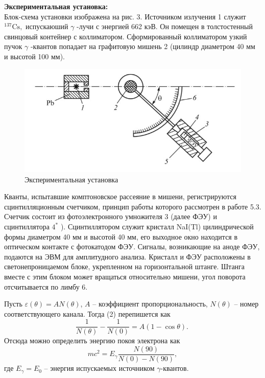 \documentclass[a4paper, 12pt]{article}%
\begin{document}
	
	\textbf{Экспериментальная установка: }\\
	Блок-схема установки изображена на рис. $3 .$ Источником излучения 1 служит $^{137} \mathrm{Cs},$ испускаюший $\gamma$ -лучи с энергией 662 кэВ. Он помещен в толстостенный свинцовый контейнер с коллиматором. Сформированный коллиматором узкий пучок $\gamma$ -квантов попадает на графитовую мишень 2 (цилиндр диаметром 40 мм и высотой 100 мм).
	
	\begin{figure}[h]
		\begin{center}
			\includegraphics[width = \textwidth]{16.jpg}
			\caption{Экспериментальная установка}
		\end{center}
	\end{figure}
	
	Кванты, испытавшие комптоновское рассеяние в мишени, регистрируются сцинтилляционным счетчиком, принцип работы которого рассмотрен в работе 5.3. Счетчик состоит из фотоэлектронного умножителя 3 (далее ФЭУ) и сцинтиллятора $4^{*}$ ). Сцинтиллятором служит кристалл NaI(Tl) цилиндрической формы диаметром 40 мм и высотой 40 мм, его выходное окно находится в оптическом контакте с фотокатодом ФЭУ. Сигналы, возникающие на аноде ФЭУ, подаются на ЭВМ для амплитудного анализа. Кристалл и ФЭУ расположены в светонепроницаемом блоке, укрепленном на горизонтальной штанге. Штанга вместе с этим блоком может вращаться относительно мишени, угол поворота отсчитывается по лимбу $6 .$
	
	Пусть $\varepsilon(\theta) = AN(\theta)$, $A$ -- коэффициент пропорциональность, $N(\theta)$ -- номер соответствующего канала. Тогда (2) перепишется как
	\begin{equation}
		\dfrac{1}{N(\theta)} - \dfrac{1}{N(0)} = A(1-\cos \theta).\
	\end{equation}
	Отсюда можно определить энергию покоя электрона как 
	\begin{equation}
		mc^2 = E_\gamma \dfrac{N(90)}{N(0) - N(90)},
	\end{equation}
	где $E_\gamma = E_0$ -- энергия испускаемых источником $\gamma$-квантов.
	
	
	
	
	
	
	
	
	
	
	
	
	
	
	
	
	
	
\end{document}
